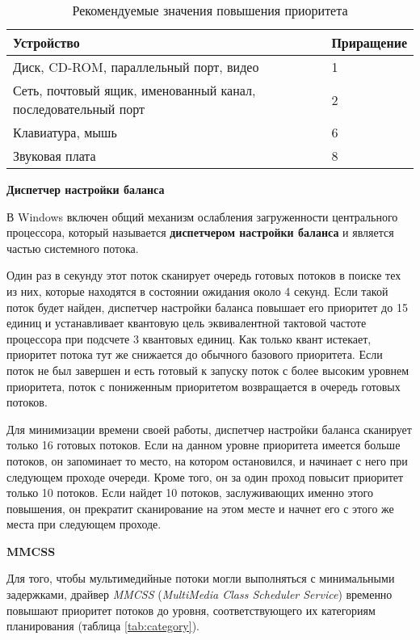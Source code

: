 \begin{table}[H]
	\begin{center}
	\caption{Рекомендуемые значения повышения приоритета}
	\label{tab:input-output}
		\begin{tabular}{|p{100mm}|l|}
			\hline
			\textbf{Устройство} & \textbf{Приращение} \\\hline
			Диск, CD-ROM, параллельный порт, видео & 1 \\ \hline
			Сеть, почтовый ящик, именованный канал, последовательный порт & 2 \\ \hline
			Клавиатура, мышь & 6 \\ \hline
			Звуковая плата & 8 \\ \hline
		\end{tabular}
	\end{center}
\end{table}

\textbf{Диспетчер настройки баланса}

В Windows включен общий механизм ослабления загруженности центрального процессора, который называется \textbf{диспетчером настройки баланса} и является частью системного потока.

Один раз в секунду этот поток сканирует очередь готовых потоков в поиске тех из них, которые находятся в состоянии ожидания около 4 секунд. Если такой поток будет найден, диспетчер настройки баланса повышает его приоритет до 15 единиц и устанавливает квантовую цель эквивалентной тактовой частоте процессора при подсчете 3 квантовых единиц. Как только квант истекает, приоритет потока тут же снижается до обычного базового приоритета. Если поток не был завершен и есть готовый к запуску поток с более высоким уровнем приоритета, поток с пониженным приоритетом возвращается в очередь готовых потоков.

Для минимизации времени своей работы, диспетчер настройки баланса сканирует только 16 готовых потоков. Если на данном уровне приоритета имеется больше потоков, он запоминает то место, на котором остановился, и начинает с него при следующем проходе очереди. Кроме того, он за один проход повысит приоритет только 10 потоков. Если найдет 10 потоков, заслуживающих именно этого повышения, он прекратит сканирование на этом месте и начнет его с этого же места при следующем проходе.

\textbf{MMCSS}

Для того, чтобы мультимедийные потоки могли выполняться с минимальными задержками, драйвер \textit{MMCSS} (\textit{MultiMedia Class Scheduler Service}) временно повышают приоритет потоков до уровня, соответствующего их категориям планирования (таблица \ref{tab:category}). 

